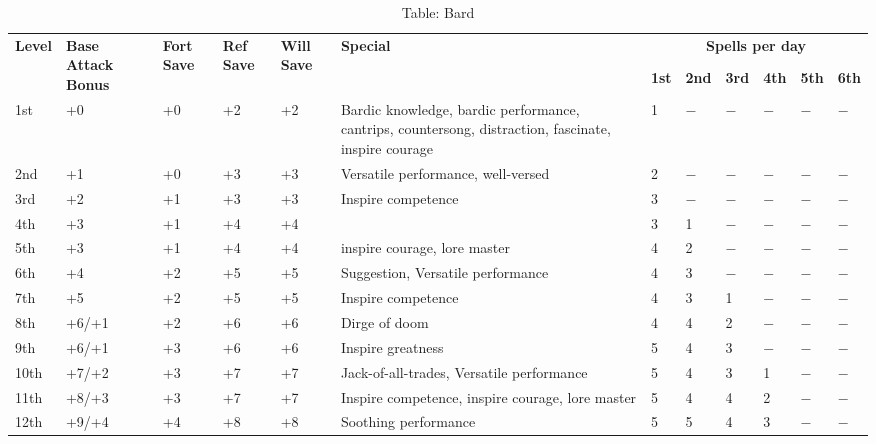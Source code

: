 \begin{table*}[]
\caption{Table: Bard}
\sffamily
\begin{tabularx}{\linewidth}{lp{5em}p{1.5em}p{1.5em}p{1.5em}Xllllll}
\multirow{2}{*}{\textbf{Level}} & \multirow{2}{*}{\parbox{5em}{\textbf{Base Attack Bonus}}} & \multirow{2}{*}{\parbox{1.5em}{\textbf{Fort Save}}} & \multirow{2}{*}{\parbox{1.5em}{\textbf{Ref Save}}} & \multirow{2}{*}{\parbox{1.5em}{\textbf{Will Save}}} & \textbf{Special}                                                                                              & \multicolumn{6}{c}{\textbf{Spells per day}} \\
                       &                                    &                            &                           &                            &                                                                                                      & \textbf{1st}  & \textbf{2nd} & \textbf{3rd} &\textbf{4th} & \textbf{5th} & \textbf{6th} \\
1st & +0 & +0 & +2 & +2 & Bardic knowledge, bardic performance, cantrips, countersong, distraction, fascinate, inspire courage & 1 & $-$ & $-$ & $-$ & $-$ & $-$\\
2nd & +1 & +0 & +3 & +3 & Versatile performance, well-versed & 2 & $-$ & $-$ & $-$ & $-$ & $-$\\
3rd & +2 & +1 & +3 & +3 & Inspire competence & 3 & $-$ & $-$ & $-$ & $-$ & $-$\\
4th & +3 & +1 & +4 & +4 &  & 3 & 1 & $-$ & $-$ & $-$ & $-$\\
5th & +3 & +1 & +4 & +4 & inspire courage, lore master & 4 & 2 & $-$ & $-$ & $-$ & $-$\\
6th & +4 & +2 & +5 & +5 & Suggestion, Versatile performance & 4 & 3 & $-$ & $-$ & $-$ & $-$\\
7th & +5 & +2 & +5 & +5 & Inspire competence & 4 & 3 & 1 & $-$ & $-$ & $-$\\
8th & +6/+1 & +2 & +6 & +6 & Dirge of doom & 4 & 4 & 2 & $-$ & $-$ & $-$\\
9th & +6/+1 & +3 & +6 & +6 & Inspire greatness & 5 & 4 & 3 & $-$ & $-$ & $-$\\
10th & +7/+2 & +3 & +7 & +7 & Jack-of-all-trades, Versatile performance & 5 & 4 & 3 & 1 & $-$ & $-$\\
11th & +8/+3 & +3 & +7 & +7 & Inspire competence, inspire courage, lore master & 5 & 4 & 4 & 2 & $-$ & $-$\\
12th & +9/+4 & +4 & +8 & +8 & Soothing performance & 5 & 5 & 4 & 3 & $-$ & $-$\\

\end{tabularx}
\end{table*}
